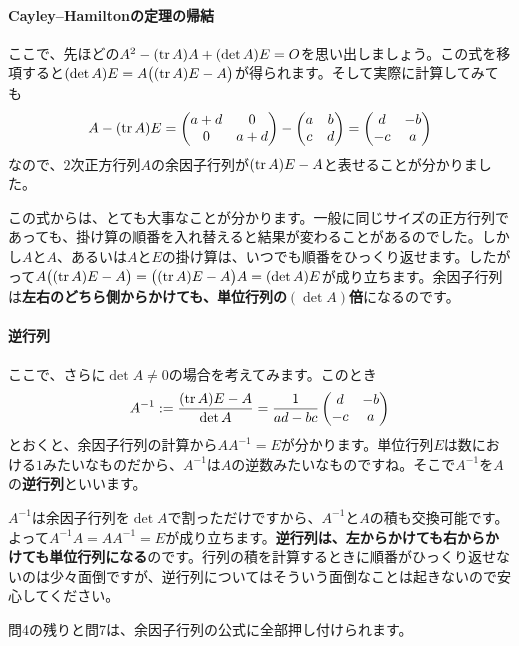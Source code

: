\paragraph{Cayley--Hamiltonの定理の帰結} ここで、先ほどの$A^2 - (\operatorname{tr} A) A + (\det A) E = O$を思い出しましょう。この式を移項すると$(\det A) E = A\bigl((\operatorname{tr} A) E - A\bigr)$が得られます。そして実際に計算してみても
\[
A - (\operatorname{tr} A) E
=
\begin{pmatrix}
a + d & 0 \\
0 & a + d
\end{pmatrix}
-
\begin{pmatrix}
a & b \\
c & d
\end{pmatrix}
=
\begin{pmatrix}
d & -b \\
-c & a
\end{pmatrix}
\]
なので、$2$次正方行列$A$の余因子行列が$(\operatorname{tr} A) E - A$と表せることが分かりました。

この式からは、とても大事なことが分かります。一般に同じサイズの正方行列であっても、掛け算の順番を入れ替えると結果が変わることがあるのでした。しかし$A$と$A$、あるいは$A$と$E$の掛け算は、いつでも順番をひっくり返せます。したがって$A\bigl((\operatorname{tr} A) E - A\bigr) = \bigl((\operatorname{tr} A) E - A\bigr) A = (\det A) E$が成り立ちます。余因子行列は\textbf{左右のどちら側からかけても、単位行列の$(\det A)$倍}になるのです。

\paragraph{逆行列}
ここで、さらに$\det A\neq 0$の場合を考えてみます。このとき
\[
A^{-1} := \frac{(\operatorname{tr} A) E - A }{\det A}
= \frac{1}{ad-bc}
\begin{pmatrix}
d & -b \\
-c & a
\end{pmatrix}
\]
とおくと、余因子行列の計算から$AA^{-1} = E$が分かります。単位行列$E$は数における$1$みたいなものだから、$A^{-1}$は$A$の逆数みたいなものですね。そこで$A^{-1}$を$A$の\textbf{逆行列}といいます。

$A^{-1}$は余因子行列を$\det A$で割っただけですから、$A^{-1}$と$A$の積も交換可能です。よって$A^{-1}A = A A^{-1} = E$が成り立ちます。\textbf{逆行列は、左からかけても右からかけても単位行列になる}のです。行列の積を計算するときに順番がひっくり返せないのは少々面倒ですが、逆行列についてはそういう面倒なことは起きないので安心してください。

問4の残りと問7は、余因子行列の公式に全部押し付けられます。
